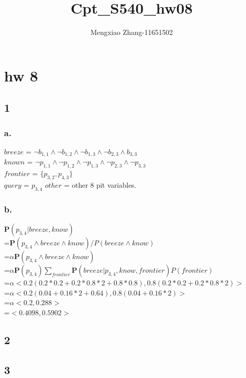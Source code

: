 \documentclass{article}
\author{Mengxiao Zhang-11651502}
\title {Cpt\_S540\_hw08}
\begin{document}
    \maketitle
    \section{hw 8}
        \subsection{1}
            \subsubsection{a.}
                $breeze$ = $\neg b_{1,1}\wedge\neg b_{1,2}\wedge\neg b_{1,3}\wedge\neg b_{2,3}\wedge b_{3,3}$\\
                $known$ = $\neg p_{1,1}\wedge\neg p_{1,2}\wedge\neg p_{1,3}\wedge\neg p_{2,3}\wedge\neg p_{3,3}$\\
                $frontier$ = $\{p_{3,2}, p_{4,3}\}$\\
                $query$ = $p_{3,4}$
                $other$ = other 8 pit variables.
            \subsubsection{b.}
                \textbf{P}$(p_{3,4}|breeze,know)$
                \\=\textbf{P}$(p_{3,4}\wedge breeze\wedge know)/P(breeze\wedge know)$
                \\=$\alpha$\textbf{P}$(p_{3,4}\wedge breeze\wedge know)$
                \\=$\alpha$\textbf{P}$(p_{3,4})\sum_{frontier}$\textbf{P}$(breeze|p_{3,4}, know, frontier)P(frontier)$
                \\=$\alpha<0.2(0.2*0.2+0.2*0.8*2+0.8*0.8), 0.8(0.2*0.2+0.2*0.8*2)>$
                \\=$\alpha<0.2(0.04+0.16*2+0.64),0.8(0.04+0.16*2)>$
                \\=$\alpha<0.2,0.288>$
                \\=$<0.4098,0.5902>$
        \subsection{2}
        \subsection{3}
\end{document}

